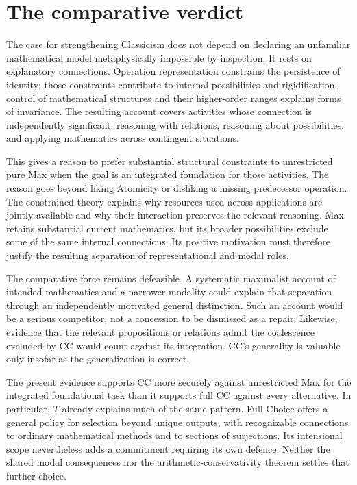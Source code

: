\documentclass[11pt]{article}
\begin{document}
\section{The comparative verdict}\label{sec:verdict}

The case for strengthening Classicism does not depend on declaring an unfamiliar mathematical model metaphysically impossible by inspection. It rests on explanatory connections. Operation representation constrains the persistence of identity; those constraints contribute to internal possibilities and rigidification; control of mathematical structures and their higher-order ranges explains forms of invariance. The resulting account covers activities whose connection is independently significant: reasoning with relations, reasoning about possibilities, and applying mathematics across contingent situations.

This gives a reason to prefer substantial structural constraints to unrestricted pure Max when the goal is an integrated foundation for those activities. The reason goes beyond liking Atomicity or disliking a missing predecessor operation. The constrained theory explains why resources used across applications are jointly available and why their interaction preserves the relevant reasoning. Max retains substantial current mathematics, but its broader possibilities exclude some of the same internal connections. Its positive motivation must therefore justify the resulting separation of representational and modal roles.

The comparative force remains defeasible. A systematic maximalist account of intended mathematics and a narrower modality could explain that separation through an independently motivated general distinction. Such an account would be a serious competitor, not a concession to be dismissed as a repair. Likewise, evidence that the relevant propositions or relations admit the coalescence excluded by CC would count against its integration. CC's generality is valuable only insofar as the generalization is correct.

The present evidence supports CC more securely against unrestricted Max for the integrated foundational task than it supports full CC against every alternative. In particular, $T$ already explains much of the same pattern. Full Choice offers a general policy for selection beyond unique outputs, with recognizable connections to ordinary mathematical methods and to sections of surjections. Its intensional scope nevertheless adds a commitment requiring its own defence. Neither the shared modal consequences nor the arithmetic-conservativity theorem settles that further choice.
\end{document}
